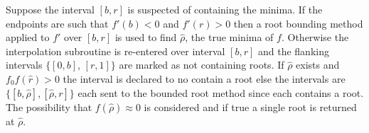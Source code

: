 Suppose the interval $[b,r]$ is suspected of containing the minima. If the endpoints are such that $f'(b) < 0$ and $f'(r)>0$ then a root bounding method applied to $f'$ over $[b,r]$ is used to find $\hat{\rho}$, the true minima of $f$. Otherwise the interpolation subroutine is re-entered over interval $[b,r]$ and the flanking intervals $\{[0,b]$, $[r,1]\}$ are marked as not containing roots. If $\hat{\rho}$ exists and $f_0f(\hat{r})>0$ the interval is declared to no contain a root else the intervals are $\{[b,\hat{\rho}], [\hat{\rho},r]\}$ each sent to the bounded root method since each contains a root. The possibility that $f(\hat{\rho}) \approx 0$ is considered and if true a single root is returned at $\hat{\rho}$.

